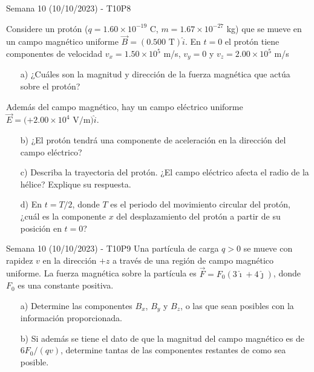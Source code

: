 \begin{frame}{Semana 10 (10/10/2023) - T10P8}
    
     Considere un protón ($q=1.60\times10^{-19}$ C, $m= 1.67\times 10^{-27}$ kg) que se mueve en un campo magnético uniforme $\vec{B}=(0.500\text{ T})\hat{i}$. En $t=0$ el protón tiene componentes de velocidad $v_x=1.50\times10^5$ m/s, $v_y=0$ y $v_z=2.00\times10^5$ m/s

\begin{itemize}
    \item[a)] ¿Cuáles son la magnitud y dirección de la fuerza magnética que actúa sobre el protón? 
    
    \end{itemize}
    
    Además del campo magnético, hay un campo eléctrico uniforme $\vec{E}=(+2.00\times 10^4\text{ V/m)}\hat{i}$.
    
    \begin{itemize}
    \item[b)] ¿El protón tendrá una componente de aceleración en la dirección del campo el\'ectrico?
    \item[c)] Describa la trayectoria del prot\'on. ¿El campo el\'ectrico afecta el radio de la hélice? Explique su respuesta.
    
    \item[d)] En $t=T/2$, donde $T$ es el periodo del movimiento circular del protón, ¿cuál es la componente $x$ del desplazamiento del protón a partir de su posición en $t=0$?

\end{itemize}

    
\end{frame}

\begin{frame}{Semana 10 (10/10/2023) - T10P9}
    Una partícula de carga $q>0$ se mueve con rapidez $v$ en la
dirección $+z$ a través de una región de campo magnético uniforme.
La fuerza magnética sobre la partícula es $\vec{F}=F_0(3\hat{\imath}+4\hat{\jmath})$, donde $F_0$
es una constante positiva.
\begin{itemize}
    \item[a)] Determine las componentes $B_x$, $B_y$ y $B_z$,
o las que sean posibles con la información proporcionada.
    \item[b)] Si además se tiene el dato de que la magnitud del campo magnético es de
$6F_0/(qv)$, determine tantas de las componentes restantes de como sea
posible.
\end{itemize}
\end{frame}